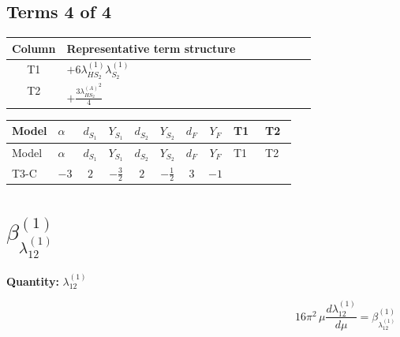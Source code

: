 \documentclass[8pt]{article}
\begin{document}
\begin{landscape}
\subsection*{Terms 4 of 4}
\begin{center}
\begin{tabular}{@{}c >{\raggedright\arraybackslash}p{0.82\linewidth}@{}}
\toprule
Column & Representative term structure \\
\midrule
T1 & \(\displaystyle +6 {\lambda_{HS_2}^{(1)}} {\lambda_{S_2}^{(1)}}\) \\
\midrule
T2 & \(\displaystyle +\frac{3 {\lambda_{HS_2}^{(A)}}^2}{4}\) \\
\midrule
\bottomrule
\end{tabular}
\end{center}
\smallskip
\tiny
\begin{longtable}{@{}llcccccc >{\raggedright\arraybackslash}p{0.21\linewidth} >{\raggedright\arraybackslash}p{0.21\linewidth}@{}}
\toprule
Model & $\alpha$ & $d_{S_1}$ & $Y_{S_1}$ & $d_{S_2}$ & $Y_{S_2}$ & $d_F$ & $Y_F$ & T1 & T2 \\
\midrule
\endfirsthead
\toprule
Model & $\alpha$ & $d_{S_1}$ & $Y_{S_1}$ & $d_{S_2}$ & $Y_{S_2}$ & $d_F$ & $Y_F$ & T1 & T2 \\
\midrule
\endhead
T3-C & $-3$ & $2$ & $-\frac{3}{2}$ & $2$ & $-\frac{1}{2}$ & $3$ & $-1$ & \scriptsize\adjustbox{max width=\linewidth}{$\begin{gathered} +6 {\lambda_{HS_2}^{(1)}} {\lambda_{S_2}^{(1)}}\end{gathered}$} & \scriptsize\adjustbox{max width=\linewidth}{$\begin{gathered} +\frac{3 {\lambda_{HS_2}^{(A)}}^2}{4}\end{gathered}$} \\
\midrule
\bottomrule
\end{longtable}
\clearpage
\section*{$\beta_{\lambda_{12}^{(1)}}^{(1)}$}
\noindent\textbf{Quantity: }$\lambda_{12}^{(1)}$\par\smallskip
\[16\pi^2\,\mu\frac{d \lambda_{12}^{(1)}}{d\mu}=\beta_{\lambda_{12}^{(1)}}^{(1)}\]

\end{landscape}
\end{document}
